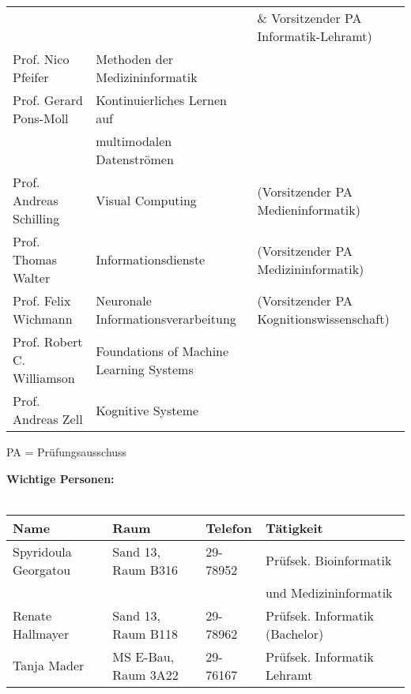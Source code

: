 \begin{tabular}{|lll|}
	                                 &                                                       & \& Vorsitzender PA Informatik-Lehramt)   \\
	Prof. Nico Pfeifer               & Methoden der Medizininformatik                        &                                          \\
	Prof. Gerard Pons-Moll           & Kontinuierliches Lernen auf                           &                                          \\
																	 & multimodalen Datenströmen														 &                                          \\
	Prof. Andreas Schilling          & Visual Computing                                      & (Vorsitzender PA Medieninformatik)       \\
	Prof. Thomas Walter              & Informationsdienste                                   & (Vorsitzender PA Medizininformatik)      \\
	Prof. Felix Wichmann             & Neuronale Informationsverarbeitung                    & (Vorsitzender PA Kognitionswissenschaft) \\
	Prof. Robert C. Williamson			 & Foundations of Machine Learning Systems							 &																			    \\
	Prof. Andreas Zell               & Kognitive Systeme                                     &                                          \\
	\hline
\end{tabular}
\scriptsize{PA = Prüfungsausschuss}


\textbf{Wichtige Personen:}\\\\
\begin{tabular}{|llll|}
	\hline
	Name								 & Raum                & Telefon  & Tätigkeit \hfill               \\
	\hline
	\hline
	Spyridoula Georgatou & Sand 13, Raum B316  & 29-78952 & Prüfsek. Bioinformatik         \\
											 &                     &          & und Medizininformatik          \\
	Renate Hallmayer		 & Sand 13, Raum B118  & 29-78962 & Prüfsek. Informatik (Bachelor) \\
	Tanja Mader					 & MS E-Bau, Raum 3A22 & 29-76167 & Prüfsek. Informatik Lehramt    \\
	\hline
\end{tabular} \\


